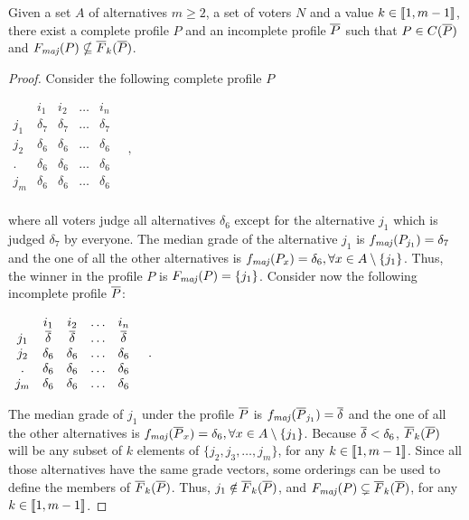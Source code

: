 	\begin{theorem}
		\label{th:notinK}
		Given a set $A$ of alternatives $m\geq 2$, a set of voters $N$ and a value $k\in \llbracket1,m-1\rrbracket$, there exist a complete profile $P$ and an incomplete profile $\overline{P}$ such that $P \in C(\overline{P})$ and $\Fmaj(P) \nsubseteq \overline{F}_k(\Pbar)$.
	\end{theorem}
	\begin{proof}
		Consider the following complete profile $P$
		\begin{center}
			$
			\begin{array}{ccccc}
				& i_1 & i_2 & \dots & i_n \\
				j_1 &	\delta_7 & \delta_7 & \dots & \delta_7 \\
				j_2 &	\delta_6 & \delta_6 & \dots & \delta_6 \\
				. &	\delta_6 & \delta_6 & \dots & \delta_6 \\
				j_m &	\delta_6 & \delta_6 & \dots & \delta_6 \\
			\end{array} \quad,
			$
		\end{center}
		where all voters judge all alternatives $\delta_6$ except for the alternative $j_1$ which is judged $\delta_7$ by everyone.
		The median grade of the alternative $j_1$ is $\fmaj(P_{j_1})=\delta_7$ and the one of all the other alternatives is $\fmaj(P_x)=\delta_6, \forall x \in A \setminus \{j_1\}$. Thus, the winner in the profile $P$ is $\Fmaj(P)=\{j_1\}$.
		Consider now the following incomplete profile $\overline{P}$:
		\begin{center}
			$
			\begin{array}{ccccc}
				& i_1 & i_2 & \dots & i_n \\
				j_1 & \overline{\delta} & \overline{\delta} & \dots & \overline{\delta} \\
				j_2 &	\delta_6 & \delta_6 & \dots & \delta_6 \\
				. &	\delta_6 & \delta_6 & \dots & \delta_6 \\
				j_m &	\delta_6 & \delta_6 & \dots & \delta_6 \\
			\end{array} \quad.
			$
		\end{center}
		The median grade of $j_1$ under the profile $\overline{P}$ is $\fmaj(\Pbar_{j_1})=\dbar$ and the one of all the other alternatives is $\fmaj(\Pbar_x)=\delta_6, \forall x \in A \setminus \{j_1\}$. Because $\overline{\delta} < \delta_6$, $\overline{F}_k(\overline{P})$ will be any subset of $k$ elements of $\{j_2,j_3,\dots,j_m\}$, for any $k\in \llbracket1,m-1\rrbracket$. Since all those alternatives have the same grade vectors, some orderings can be used to define the members of $\overline{F}_k(\overline{P})$.	
		Thus, $j_1 \notin \overline{F}_k(\overline{P})$, and $\Fmaj(P) \subsetneq \overline{F}_k(\Pbar)$, for any $k\in \llbracket1,m-1\rrbracket$.
	\end{proof}

